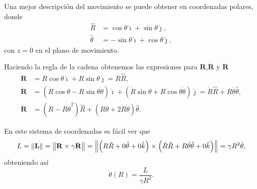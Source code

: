 Una mejor descripción del movimiento se puede obtener en coordenadas polares, donde
\begin{align}
 \hat{R} &= \cos \theta \hat{\imath} + \sin \theta \hat{\jmath} \nonumber, \\
 \hat{\theta} &= -\sin \theta \hat{\imath} + \cos \theta \hat{\jmath},
 \label{eq:polar_transformation}
\end{align}
con $z=0$ en el plano de movimiento. 

Haciendo la regla de la cadena obtenemos las expresiones para  $\mathbf{R}$,$\dot{\mathbf{R}}$ y $\ddot{\mathbf{R}}$
\begin{align}
 \mathbf{R} &= R \cos \theta \hat{\imath} + R \sin \theta \hat{\jmath} = R \hat{R}, \\
 \dot{\mathbf{R}} &= \left( \dot{R} \cos \theta - R \sin \theta \dot{\theta} \right) \hat{\imath} + \left( \dot{R} \sin \theta + R \cos \theta \dot{\theta} \right) \hat{\jmath} = \dot{R}\hat{R} + R \dot{\theta} \hat{\theta}, \\
 \ddot{\mathbf{R}} &= \left(\ddot{R} - R \dot{\theta}^2 \right) \hat{R} + \left( R \ddot{\theta} + 2 \dot{R}\dot{\theta} \right) \hat{\theta}.
 \label{eq:motion_polar_variables}
\end{align}

En este sistema de coordenadas es fácil ver que
\begin{equation}
 L = \left\lVert \mathbf{L} \right\rVert = \left\lVert \mathbf{R} \times \gamma \dot{\mathbf{R}} \right\rVert = \left\lVert \left( R \hat{R} + 0 \hat{\theta} + 0 \hat{k} \right) \times \left( \dot{R} \hat{R} + R \dot{\theta} \hat{\theta} + 0\hat{k} \right) \right\rVert = \gamma R^2 \dot{\theta},
\end{equation}
obteniendo así
\begin{equation}
\dot{\theta}(R) = \frac{L}{\gamma R^2}.
\label{eq:2body_ang_vel}
\end{equation}

